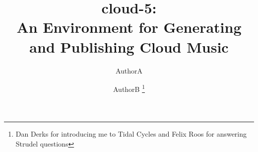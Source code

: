 \documentclass[runningheads,a4paper]{llncs}
\begin{document}
\mainmatter  %

\title{cloud-5:\\An Environment for Generating and Publishing Cloud Music}




\author{AuthorA\and AuthorB \thanks{Dan Derks for introducing me to Tidal Cycles and Felix Roos for answering Strudel questions}}
%


%
%


\maketitle
\end{document}
